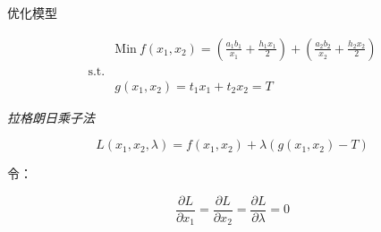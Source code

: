 \documentclass[mathserif, table]{beamer}
\begin{document}
\begin{frame}{优化模型}
  
  \begin{block}{}
    \[ 
    \begin{array}{lc}
      & \mbox{Min}\ f(x_1, x_2) = (\frac{a_1 b_1}{x_1} + \frac{h_1 x_1}{2}) + (\frac{a_2 b_2}{x_2} + \frac{h_2 x_2}{2}) \\
      \mbox{s.t.} &  \\
      &
      g(x_1, x_2) = t_1 x_1 + t_2 x_2 = T 
    \end{array}
    \]
  \end{block}

  \emph{拉格朗日乘子法}

  \[
    L(x_1, x_2, \lambda) = f(x_1, x_2) + \lambda (g(x_1, x_2) - T)
  \]

  令：

  \[
    \frac{\partial L}{\partial x_1} = \frac{\partial L}{\partial x_2} = \frac{\partial L}{\partial \lambda} = 0
  \]
  
\end{frame}
\end{document}
